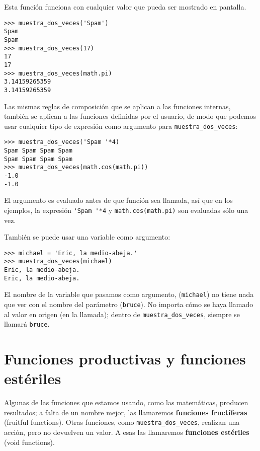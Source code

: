 Esta función funciona con cualquier valor que pueda ser mostrado en pantalla.

\beforeverb
\begin{verbatim}
>>> muestra_dos_veces('Spam')
Spam
Spam
>>> muestra_dos_veces(17)
17
17
>>> muestra_dos_veces(math.pi)
3.14159265359
3.14159265359
\end{verbatim}
\afterverb
%
Las mismas reglas de composición que se aplican a las funciones internas, también
se aplican a las funciones definidas por el usuario, de modo que podemos usar cualquier tipo
de expresión como argumento para \verb"muestra_dos_veces":


\beforeverb
\begin{verbatim}
>>> muestra_dos_veces('Spam '*4)
Spam Spam Spam Spam
Spam Spam Spam Spam
>>> muestra_dos_veces(math.cos(math.pi))
-1.0
-1.0
\end{verbatim}
\afterverb
%
El argumento es evaluado antes de que función sea llamada, así
que en los ejemplos, la expresión \verb"'Spam '*4" y
{\tt math.cos(math.pi)} son evaluadas sólo una vez.


También se puede usar una variable como argumento:

\beforeverb
\begin{verbatim}
>>> michael = 'Eric, la medio-abeja.'
>>> muestra_dos_veces(michael)
Eric, la medio-abeja.
Eric, la medio-abeja.
\end{verbatim}
\afterverb
%
El nombre de la variable que pasamos como argumento, ({\tt michael}) no
tiene nada que ver con el nombre del parámetro ({\tt bruce}). No
importa cómo se haya llamado al valor en origen (en la llamada);
dentro de \verb"muestra_dos_veces", siempre se llamará {\tt bruce}.

\section{Funciones productivas y funciones estériles}


Algunas de las funciones que estamos usando, como las matemáticas, producen
resultados; a falta de un nombre mejor, las llamaremos {\bf funciones fructíferas} (fruitful functions).
Otras funciones, como \verb"muestra_dos_veces", realizan una
acción, pero no devuelven un valor. A esas las llamaremos {\bf funciones
estériles} (void functions).

